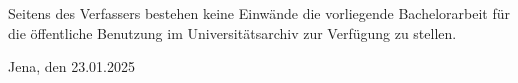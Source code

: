 \documentclass[a4paper, 12pt]{article}
\begin{document}


\newpage

\thispagestyle{empty} 
\tableofcontents
\newpage



\newpage














\clearpage

\printbibliography



\newpage
\thispagestyle{empty} 




\begin{otherlanguage}{ngerman}


Seitens des Verfassers bestehen keine Einwände die vorliegende Bachelorarbeit für die öffentliche Benutzung im
Universitätsarchiv zur Verfügung zu stellen.
\end{otherlanguage}

\vspace{30mm}

{\raggedleft 
Jena, den 23.01.2025 \\
}
\end{document}
